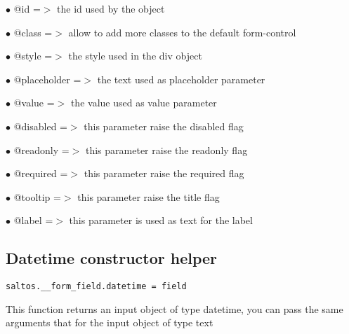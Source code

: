 \documentclass[a4paper]{book}
\begin{document}
\begin{compactitem}
\item[\color{myblue}$\bullet$] @id          =$>$ the id used by the object
\item[\color{myblue}$\bullet$] @class       =$>$ allow to add more classes to the default form-control
\item[\color{myblue}$\bullet$] @style       =$>$ the style used in the div object
\item[\color{myblue}$\bullet$] @placeholder =$>$ the text used as placeholder parameter
\item[\color{myblue}$\bullet$] @value       =$>$ the value used as value parameter
\item[\color{myblue}$\bullet$] @disabled    =$>$ this parameter raise the disabled flag
\item[\color{myblue}$\bullet$] @readonly    =$>$ this parameter raise the readonly flag
\item[\color{myblue}$\bullet$] @required    =$>$ this parameter raise the required flag
\item[\color{myblue}$\bullet$] @tooltip     =$>$ this parameter raise the title flag
\item[\color{myblue}$\bullet$] @label       =$>$ this parameter is used as text for the label
\end{compactitem}

\hypertarget{toc381}{}
\subsection{Datetime constructor helper}

\begin{lstlisting}
saltos.__form_field.datetime = field
\end{lstlisting}

This function returns an input object of type datetime, you can pass the same arguments
that for the input object of type text
\end{document}

